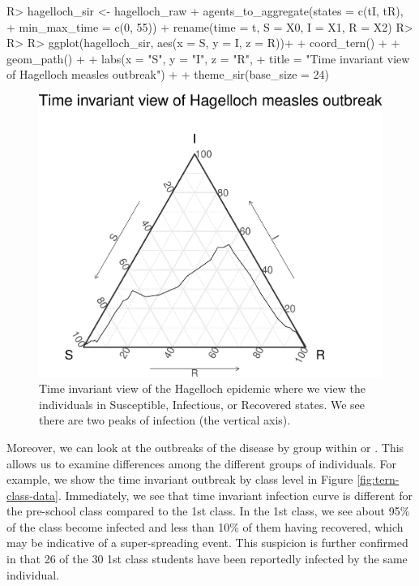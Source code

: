 \documentclass[
  shortnames]{jss}
\begin{document}
\begin{CodeChunk}
\begin{CodeInput}
R> hagelloch_sir <- hagelloch_raw %
+   agents_to_aggregate(states = c(tI, tR),
+                       min_max_time = c(0, 55)) %
+   rename(time = t, S = X0, I = X1, R = X2)
R> 
R> 
R> ggplot(hagelloch_sir, aes(x = S, y = I, z = R))+
+   coord_tern() +
+   geom_path() +
+   labs(x = "S", y = "I", z = "R",
+        title = "Time invariant view of Hagelloch measles outbreak") + 
+   theme_sir(base_size = 24)
\end{CodeInput}
\begin{figure}[H]

{\centering \includegraphics{Figs/unnamed-chunk-9-1} 

}

\caption{\label{fig:hag-tern-raw}Time invariant view of the Hagelloch epidemic where we view the individuals in Susceptible, Infectious, or Recovered states.  We see there are two peaks of infection (the vertical axis).}\label{fig:unnamed-chunk-9}
\end{figure}
\end{CodeChunk}

Moreover, we can look at the outbreaks of the disease by group within
 or . This allows us
to examine differences among the different groups of individuals. For
example, we show the time invariant outbreak by class level in Figure
\ref{fig:tern-class-data}. Immediately, we see that time invariant
infection curve is different for the pre-school class compared to the
1st class. In the 1st class, we see about 95\% of the class become
infected and less than 10\% of them having recovered, which may be
indicative of a super-spreading event. This suspicion is further
confirmed in that 26 of the 30 1st class students have been reportedly
infected by the same individual.
\end{document}
